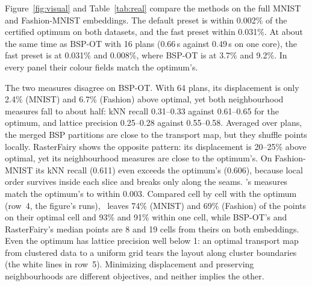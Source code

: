 Figure~\ref{fig:visual} and Table~\ref{tab:real} compare the methods on the full MNIST
and Fashion-MNIST embeddings. The default preset is within 0.002\% of the certified
optimum on both datasets, and the fast preset within 0.031\%. At about the same time as BSP-OT
with 16 plans (0.66\,s against 0.49\,s on one core), the fast preset is at 0.031\% and
0.008\%, where BSP-OT is at 3.7\% and 9.2\%.
In every panel their colour fields match the optimum's.

The two measures disagree on BSP-OT. With 64 plans, its displacement is only 2.4\% (MNIST) and
6.7\% (Fashion) above optimal, yet both neighbourhood measures fall to about half: kNN recall
0.31--0.33 against 0.61--0.65 for the optimum, and lattice precision 0.25--0.28 against
0.55--0.58. Averaged over plans, the merged BSP partitions are close to the transport
map, but they shuffle points locally. RasterFairy shows the opposite pattern: its
displacement is 20--25\% above optimal, yet its neighbourhood measures are close to the
optimum's. On Fashion-MNIST its kNN recall (0.611) even exceeds the optimum's (0.606),
because local order survives inside each slice and breaks only along the seams.
\ShuffleSnap's measures match the optimum's to within 0.003. Compared cell by cell with the
optimum (row~4, the figure's runs), \ShuffleSnap\ leaves 74\% (MNIST) and 69\% (Fashion)
of the points on their optimal cell and 93\% and 91\% within one cell, while BSP-OT's and
RasterFairy's median points are 8 and 19 cells from theirs on both embeddings. Even the optimum has lattice precision well below 1: an optimal transport map
from clustered data to a uniform grid tears the layout along cluster boundaries (the
white lines in row~5). Minimizing displacement and preserving neighbourhoods are
different objectives, and neither implies the other.
